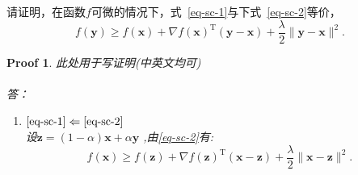 \documentclass[a4paper,UTF8]{article}
\numberwithin{equation}{section}
\newtheorem*{myProof}{Proof}
\begin{document}
请证明，在函数$f$可微的情况下，式~\eqref{eq-sc-1}与下式~\eqref{eq-sc-2}等价，
\begin{equation}
  \label{eq-sc-2}
  f(\mathbf{y}) \geq f(\mathbf{x}) + \nabla f(\mathbf{x})^\mathrm{T}(\mathbf{y}-\mathbf{x}) + \frac{\lambda}{2}\lVert \mathbf{y} - \mathbf{x}\rVert^2.
\end{equation}
\begin{myProof}
此处用于写证明(中英文均可)
~\\
~\\
答：\\
\begin{enumerate}
\item[(1)]$\ref{eq-sc-1} \Leftarrow \ref{eq-sc-2}$\\
设$\mathbf{z}=(1-\alpha)\mathbf{x}+\alpha \mathbf{y}$
,由\ref{eq-sc-2}有:\\
\begin{equation}
  \label{eq-sc-3}
  f(\mathbf{x}) \geq f(\mathbf{z}) + \nabla f(\mathbf{z})^\mathrm{T}(\mathbf{x}-\mathbf{z}) + \frac{\lambda}{2}\lVert \mathbf{x} - \mathbf{z}\rVert^2.
\end{equation}


\end{enumerate}
\end{myProof}
\end{document}
